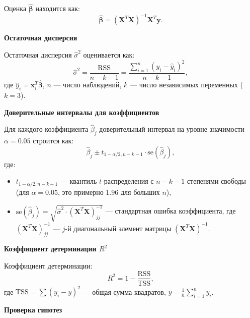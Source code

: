 \documentclass[14pt]{extreport}
\begin{document}
Оценка \(\hat{\mathbf{\beta}}\) находится как:
\begin{equation}
\hat{\mathbf{\beta}} = (\mathbf{X}^T \mathbf{X})^{-1} \mathbf{X}^T \mathbf{y}.
\end{equation}

\textbf{Остаточная дисперсия}

Остаточная дисперсия \(\hat{\sigma}^2\) оценивается как:
\begin{equation}
\hat{\sigma}^2 = \frac{\text{RSS}}{n - k - 1} = \frac{\sum_{i=1}^n (y_i - \hat{y}_i)^2}{n - k - 1},
\end{equation}
где \(\hat{y}_i = \mathbf{x}_i^T \hat{\mathbf{\beta}}\), \(n\) — число наблюдений, \(k\) — число независимых переменных (\(k = 3\)).

\textbf{Доверительные интервалы для коэффициентов}

Для каждого коэффициента \(\hat{\beta}_j\) доверительный интервал на уровне значимости \(\alpha = 0.05\) строится как:
\begin{equation}
\hat{\beta}_j \pm t_{1-\alpha/2, n-k-1} \cdot \text{se}(\hat{\beta}_j),
\end{equation}
где:
\begin{itemize}
    \item \(t_{1-\alpha/2, n-k-1}\) — квантиль \(t\)-распределения с \(n-k-1\) степенями свободы (для \(\alpha = 0.05\), это примерно 1.96 для больших \(n\)),
    \item \(\text{se}(\hat{\beta}_j) = \sqrt{\hat{\sigma}^2 \cdot (\mathbf{X}^T \mathbf{X})^{-1}_{jj}}\) — стандартная ошибка коэффициента, где \((\mathbf{X}^T \mathbf{X})^{-1}_{jj}\) — \(j\)-й диагональный элемент матрицы \((\mathbf{X}^T \mathbf{X})^{-1}\).
\end{itemize}

\textbf{Коэффициент детерминации \(R^2\)}

Коэффициент детерминации:
\begin{equation}
R^2 = 1 - \frac{\text{RSS}}{\text{TSS}},
\end{equation}
где \(\text{TSS} = \sum (y_i - \bar{y})^2\) — общая сумма квадратов, \(\bar{y} = \frac{1}{n} \sum_{i=1}^n y_i\).

\textbf{Проверка гипотез}
\end{document}
